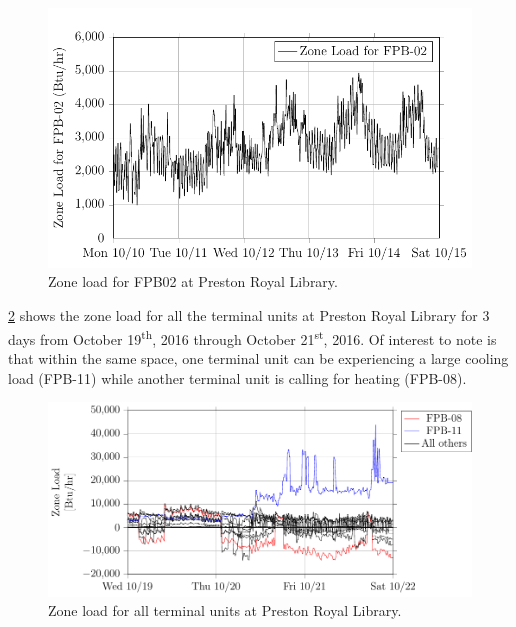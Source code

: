 \begin{figure}
\centering
\includegraphics{Plots/2017-04-03-1250-ZoneLoadforFPB02-TikzData.pdf}
\caption{Zone load for FPB02 at Preston Royal Library.}
\label{fig:2017-04-03-1250-ZoneLoadforFPB02-TikzData}
\end{figure}


\figref{} \ref{fig:2017-06-05-0822-ZoneLoadforFPB02-TikzData} shows the
zone load for all the terminal units at Preston Royal Library for 3 days
from October 19\textsuperscript{th}, 2016 through October
21\textsuperscript{st}, 2016. Of interest to note is that within the
same space, one terminal unit can be experiencing a large cooling load
(FPB-11) while another terminal unit is calling for heating (FPB-08). 


\begin{figure}
\centering
\includegraphics{Plots/2017-06-05-0822-ZoneLoadforFPB02-TikzData.pdf}
\caption{Zone load for all terminal units at Preston Royal Library.}
\label{fig:2017-06-05-0822-ZoneLoadforFPB02-TikzData}
\end{figure}


